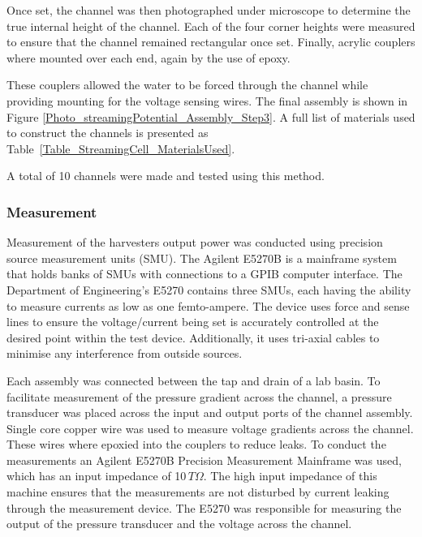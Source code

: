     Once set, the channel was then photographed under microscope to determine the true internal height of the channel.
    Each of the four corner heights were measured to ensure that the channel remained rectangular once set.
    Finally, acrylic couplers where mounted over each end, again by the use of epoxy.

    These couplers allowed the water to be forced through the channel while providing mounting for the voltage sensing wires.
    The final assembly is shown in Figure \ref{Photo_streamingPotential_Assembly_Step3}.
    A full list of materials used to construct the channels is presented as Table~\ref{Table_StreamingCell_MaterialsUsed}.

    A total of 10 channels were made and tested using this method.

  \subsubsection*{Measurement}

    Measurement of the harvesters output power was conducted using precision source measurement units (SMU).
    The Agilent E5270B is a mainframe system that holds banks of SMUs with connections to a GPIB computer interface.
    The Department of Engineering's E5270 contains three SMUs, each having the ability to measure currents as low as one femto-ampere.
    The device uses force and sense lines to ensure the voltage/current being set is accurately controlled at the desired point within the test device.
    Additionally, it uses tri-axial cables to minimise any interference from outside sources.



    Each assembly was connected between the tap and drain of a lab basin.  To
    facilitate measurement of the pressure gradient across the channel, a pressure
    transducer was placed across the input and output ports of the channel
    assembly. Single core copper wire was used to measure voltage gradients across
    the channel. These wires where epoxied into the couplers to reduce leaks. To
    conduct the measurements an Agilent E5270B Precision Measurement Mainframe was
    used, which has an input impedance of 10${\displaystyle \, T\Omega}$. The high
    input impedance of this machine ensures that the measurements are not disturbed
    by current leaking through the measurement device. The E5270 was responsible
    for measuring the output of the pressure transducer and the voltage across the
    channel.


